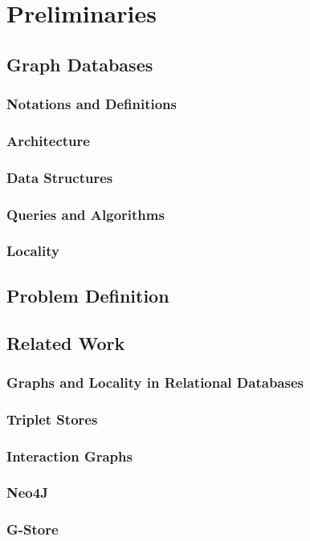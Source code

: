 \chapter{Preliminaries}\label{\positionnumber}

\section{Graph Databases}\label{\positionnumber}
    \subsection{Notations and Definitions}\label{\positionnumber}
    \subsection{Architecture}\label{\positionnumber}
    \subsection{Data Structures}\label{\positionnumber}
    \subsection{Queries and Algorithms}\label{\positionnumber}
    \subsection{Locality}\label{\positionnumber}

\section{Problem Definition}\label{\positionnumber}

\section{Related Work}\label{\positionnumber}
    \subsection{Graphs and Locality in Relational Databases}\label{\positionnumber}
    \subsection{Triplet Stores}\label{\positionnumber}
    \subsection{Interaction Graphs}\label{\positionnumber}
    \subsection{Neo4J}\label{\positionnumber}
    \subsection{G-Store}\label{\positionnumber}
    
